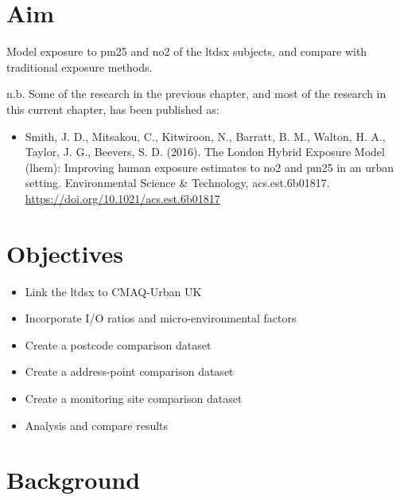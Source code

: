 \section{Aim}
\label{sec:2aim}

Model exposure to \gls{pm25} and \gls{no2} of the \gls{ltdsx} subjects, and compare  with traditional exposure methods.

n.b.  Some of the research in the previous chapter, and most of the research in this current chapter, has been published as:

\begin{itemize}
\item Smith, J. D., Mitsakou, C., Kitwiroon, N., Barratt, B. M., Walton, H. A., Taylor, J. G., Beevers, S. D. (2016). The London Hybrid Exposure Model (\gls{lhem}): Improving human exposure estimates to \gls{no2} and \gls{pm25} in an urban setting. Environmental Science \& Technology, acs.est.6b01817. \url{https://doi.org/10.1021/acs.est.6b01817}
\end{itemize}

\section{Objectives}
\label{sec:2objectives}

\begin{itemize}
\item Link the \gls{ltdsx} to CMAQ-Urban UK
\item Incorporate I/O ratios and micro-environmental factors
\item Create a postcode comparison dataset
\item Create a address-point comparison dataset
\item Create a monitoring site comparison dataset
\item Analysis and compare results
\end{itemize}

\section{Background}
\label{sec:2background}

